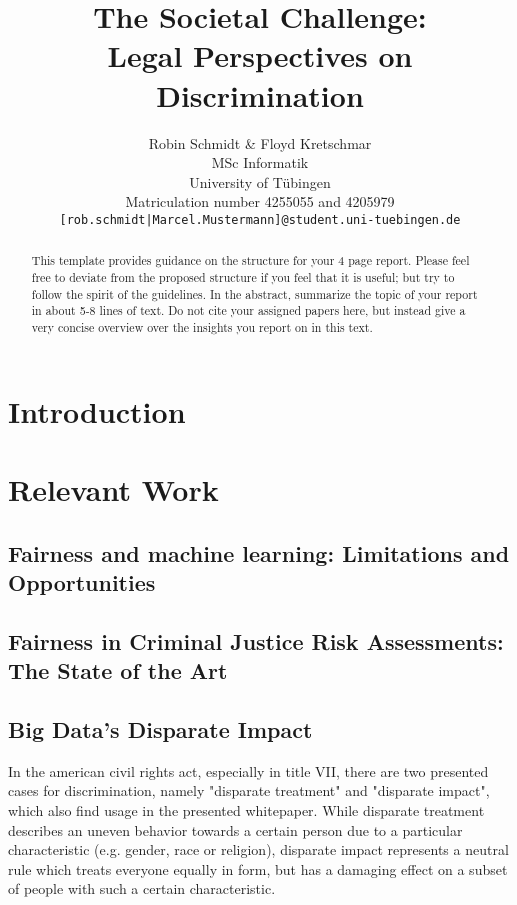\documentclass{article}
\title{The Societal Challenge: \\ Legal Perspectives on Discrimination}
\author{%
  Robin Schmidt \& Floyd Kretschmar\\
  MSc Informatik \\
  University of Tübingen\\
  Matriculation number 4255055 and 4205979\\
  \texttt{[rob.schmidt|Marcel.Mustermann]@student.uni-tuebingen.de}
}
\begin{document}
\maketitle

\begin{abstract}
  This template provides guidance on the structure for your 4 page report. Please feel free to deviate from the proposed structure if you feel that it is useful; but try to follow the spirit of the guidelines.
  In the abstract, summarize the topic of your report in about 5-8 lines of text. Do not cite your assigned papers here, but instead give a very concise overview over the insights you report on in this text.
\end{abstract}

\section{Introduction}

\section{Relevant Work}

\subsection{Fairness and machine learning: Limitations and Opportunities}


\subsection{Fairness in Criminal Justice Risk Assessments: The State of the Art}


\subsection{Big Data’s Disparate Impact}


In the american civil rights act, especially in title VII, there are two presented cases for discrimination, namely "disparate treatment" and "disparate impact", which also find usage in the presented whitepaper. While disparate treatment describes an uneven behavior towards a certain person due to a particular characteristic (e.g. gender, race or religion), disparate impact represents a neutral rule which treats everyone equally in form, but has a damaging effect on a subset of people with such a certain characteristic.
\end{document}

